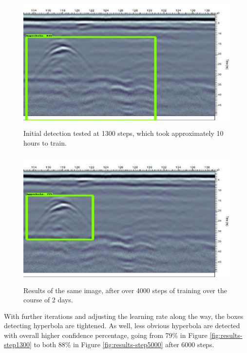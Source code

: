 \documentclass[se,blockletter]{uw-wkrpt}
\begin{document}
\begin{figure}
  \centering
  \includegraphics[height=7cm]{medium-detection}
  \caption{Initial detection tested at 1300 steps, which took approximately 10 hours to train.}
  \label{fig:medium-detection}
\end{figure}

\begin{figure}
  \centering
  \includegraphics[height=7cm]{medium-detection-improvements}
  \caption{Results of the same image, after over 4000 steps of training over the course of 2 days.}
  \label{fig:medium-detection-improvements}
\end{figure}

With further iterations and adjusting the learning rate along the way, the boxes detecting hyperbola are tightened. As well, less obvious hyperbola are detected with overall higher confidence percentage, going from 79\% in Figure \ref{fig:results-step1300} to both 88\% in Figure \ref{fig:results-step5000} after 6000 steps. 
\end{document}
